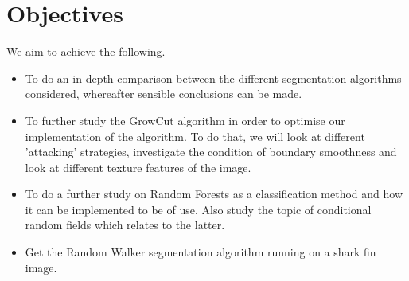 \documentclass[a4paper,10pt]{article}
\begin{document}
\section{Objectives}
We aim to achieve the following.
\begin{itemize}
 \item To do an in-depth comparison between the different segmentation algorithms considered, whereafter sensible conclusions can be made. 
 \item To further study the GrowCut algorithm in order to optimise our implementation of the algorithm.  To do that, we will look at different 'attacking' strategies, investigate the condition of boundary smoothness and look at different texture features of the image.
 \item To do a further study on Random Forests as a classification method and how it can be implemented to be of use.  Also study the topic of conditional random fields which relates to the latter.
 \item Get the Random Walker segmentation algorithm running on a shark fin image.
\end{itemize}

\newpage

\end{document}
